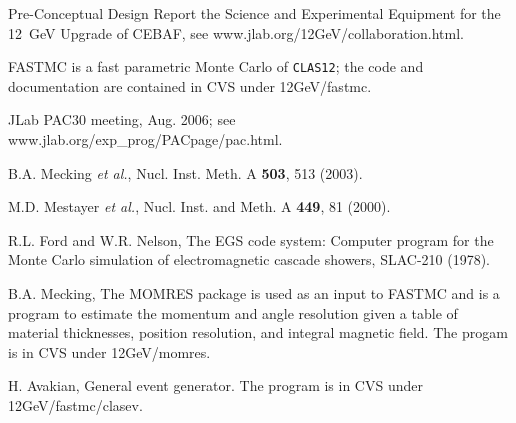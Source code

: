 \documentclass[12pt]{article}
\begin{document}
\begin{thebibliography}{99}

Pre-Conceptual Design Report the Science and Experimental Equipment
for the 12~GeV Upgrade of CEBAF, see www.jlab.org/12GeV/collaboration.html.

FASTMC is a fast parametric Monte Carlo of {\tt CLAS12}; the code and 
documentation are contained in CVS under 12GeV/fastmc.

JLab PAC30 meeting, Aug. 2006; see www.jlab.org/exp\_prog/PACpage/pac.html.

B.A. Mecking {\it et al.}, Nucl. Inst. Meth. A {\bf 503}, 513 (2003).

M.D. Mestayer {\it et al.}, Nucl. Inst. and Meth. A {\bf 449}, 81 (2000).

R.L. Ford and W.R. Nelson, The EGS code system: Computer program for the 
Monte Carlo simulation of electromagnetic cascade showers, SLAC-210 (1978).
 
B.A. Mecking, The MOMRES package is used as an input to FASTMC and is
a program to estimate the momentum and angle resolution given a table of 
material thicknesses, position resolution, and integral magnetic field.
The progam is in CVS under 12GeV/momres.

H. Avakian, General event generator.  The program is in CVS under
12GeV/fastmc/clasev.

\end{thebibliography}
\end{document}
